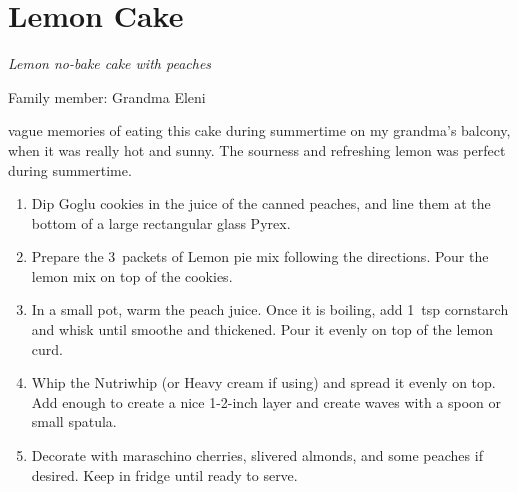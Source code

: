 \chapter{Lemon Cake}
\label{ch:Lemoncake}



\textit{Lemon no-bake cake with peaches}

Family member: Grandma Eleni

 vague memories of eating this cake during summertime on my grandma's balcony, when it was really hot and sunny. The sourness and refreshing lemon was perfect during summertime.

\begin{enumerate}
    \item Dip Goglu cookies in the juice of the canned peaches, and line them at the bottom of a large rectangular glass Pyrex.
    \item Prepare the 3~packets of Lemon pie mix following the directions. Pour the lemon mix on top of the cookies.
    \item In a small pot, warm the peach juice. Once it is boiling, add 1~tsp cornstarch and whisk until smoothe and thickened. Pour it evenly on top of the lemon curd.
    \item Whip the Nutriwhip (or Heavy cream if using) and spread it evenly on top. Add enough to create a nice 1-2-inch layer and create waves with a spoon or small spatula.
    \item Decorate with maraschino cherries, slivered almonds, and some peaches if desired. Keep in fridge until ready to serve.
\end{enumerate}


